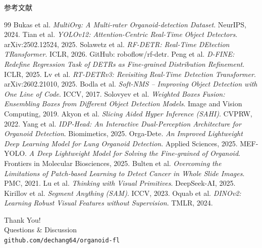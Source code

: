 \documentclass[aspectratio=169, 10pt]{beamer}
\begin{document}
\begin{frame}[allowframebreaks]{参考文献}
  \footnotesize
  \begin{thebibliography}{99}
     Bukas et al. \textit{MultiOrg: A Multi-rater Organoid-detection Dataset}. NeurIPS, 2024.
     Tian et al. \textit{YOLOv12: Attention-Centric Real-Time Object Detectors}. arXiv:2502.12524, 2025.
     Solawetz et al. \textit{RF-DETR: Real-Time DEtection TRansformer}. ICLR, 2026. GitHub: roboflow/rf-detr.
     Peng et al. \textit{D-FINE: Redefine Regression Task of DETRs as Fine-grained Distribution Refinement}. ICLR, 2025.
     Lv et al. \textit{RT-DETRv3: Revisiting Real-Time Detection Transformer}. arXiv:2602.21010, 2025.
     Bodla et al. \textit{Soft-NMS -- Improving Object Detection with One Line of Code}. ICCV, 2017.
     Solovyev et al. \textit{Weighted Boxes Fusion: Ensembling Boxes from Different Object Detection Models}. Image and Vision Computing, 2019.
     Akyon et al. \textit{Slicing Aided Hyper Inference (SAHI)}. CVPRW, 2022.
     Yang et al. \textit{IDP-Head: An Interactive Dual-Perception Architecture for Organoid Detection}. Biomimetics, 2025.
     Orga-Dete. \textit{An Improved Lightweight Deep Learning Model for Lung Organoid Detection}. Applied Sciences, 2025.
     MEF-YOLO. \textit{A Deep Lightweight Model for Solving the Fine-grained of Organoid}. Frontiers in Molecular Biosciences, 2025.
     Bulten et al. \textit{Overcoming the Limitations of Patch-based Learning to Detect Cancer in Whole Slide Images}. PMC, 2021.
     Lu et al. \textit{Thinking with Visual Primitives}. DeepSeek-AI, 2025.
     Kirillov et al. \textit{Segment Anything (SAM)}. ICCV, 2023.
     Oquab et al. \textit{DINOv2: Learning Robust Visual Features without Supervision}. TMLR, 2024.
  \end{thebibliography}
\end{frame}

\begin{frame}[plain]
  \centering
  \vfill
  \Large\textcolor{myblue}{Thank You!}\\[0.8em]
  \normalsize Questions \& Discussion\\[1.5em]
  \footnotesize\texttt{github.com/dechang64/organoid-fl}
  \vfill
\end{frame}
\end{document}
